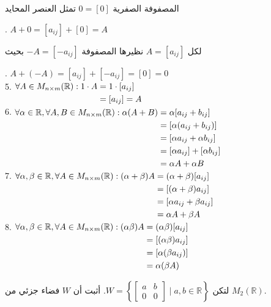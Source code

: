\noindent
المصفوفة الصفرية $0=[0]$ تمثل العنصر المحايد

. $A+0 = [a_{ij}] + [0] = A$

\noindent
لكل $A=[a_{ij}]$ نظيرها المصفوفة $-A=[-a_{ij}]$ بحيث 

. $A + (-A) = [a_{ij}] + [-a_{ij}] = [0] =0$  \\
5. $
\begin{aligned}[t]
	\forall A \in M_{n\times m}(\mathbb{R}) : 1\cdot A
	&= 1\cdot [a_{ij}]\\
	&= [a_{ij}] =A
\end{aligned}
$\\
6. $
\begin{aligned}[t]
	\forall\alpha\in\mathbb{R}, \forall A, B\in M_{n\times m}(\mathbb{R}) : \alpha(A+B)
	&= \alpha [a_{ij}+b_{ij}]\\
	&= [\alpha (a_{ij} + b_{ij})]\\
	&= [\alpha a_{ij} + \alpha b_{ij}]\\
	&= [\alpha a_{ij} ] + [\alpha b_{ij}]\\
	&= \alpha A + \alpha B
\end{aligned}
$\\
7. $
\begin{aligned}[t]
	\forall \alpha, \beta \in \mathbb{R}, \forall A\in M_{n\times m}(\mathbb{R}) : (\alpha+\beta)A
	&= (\alpha+\beta) [a_{ij}]\\
	&= [(\alpha+\beta)a_{ij}]\\
	&= [\alpha a_{ij} + \beta a_{ij}]\\
	&= \alpha A + \beta A
\end{aligned}
$\\
8. $
\begin{aligned}[t]
	\forall \alpha, \beta \in \mathbb{R}, \forall A\in M_{n\times m}(\mathbb{R}) : (\alpha\beta)A
	&= (\alpha\beta) [a_{ij}]\\
	&= [(\alpha\beta)a_{ij}]\\
	&= [\alpha(\beta a_{ij})]\\
	&= \alpha (\beta A)
\end{aligned}
$
\begin{example}
	لتكن $W = \left\{ \begin{bmatrix} a & b \\ 0 & 0 \end{bmatrix} \mid a, b \in \mathbb{R} \right\}$. أثبت أن $W$ فضاء جزئي من $M_2(\mathbb{R})$.
\end{example}

